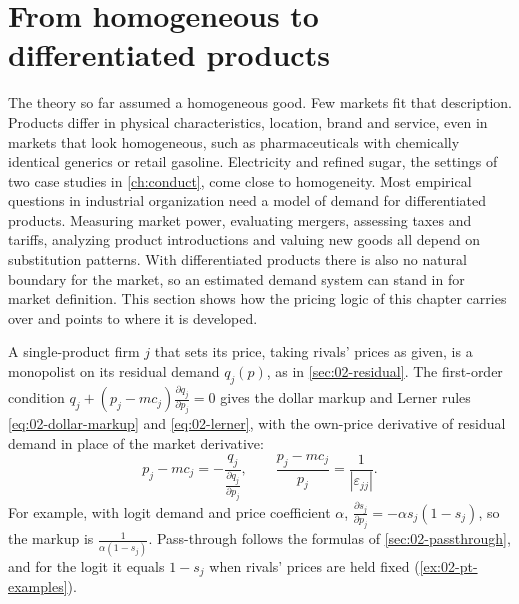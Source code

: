 \section{From homogeneous to differentiated products}\label{sec:02-bridge}

The theory so far assumed a homogeneous good. Few markets fit that description. Products differ in physical
characteristics, location, brand and service, even in markets that look homogeneous, such as pharmaceuticals with
chemically identical generics or retail gasoline. Electricity and refined sugar, the settings of two case studies in
\cref{ch:conduct}, come close to homogeneity. Most empirical questions in industrial organization need a model of
demand for differentiated products. Measuring market power, evaluating mergers, assessing taxes and tariffs,
analyzing product introductions and valuing new goods all depend on substitution patterns. With differentiated
products there is also no natural boundary for the market, so an estimated demand system can stand in for
market definition. This section shows how the pricing logic of this chapter carries over and points to where it is
developed.

A single-product firm $j$ that sets its price, taking rivals' prices as given, is a monopolist on its residual
demand $q_j(p)$, as in \cref{sec:02-residual}. The first-order condition
$q_j + (p_j - mc_j)\frac{\partial q_j}{\partial p_j} = 0$ gives the dollar markup and Lerner rules
\eqref{eq:02-dollar-markup} and \eqref{eq:02-lerner}, with the own-price derivative of residual demand in place
of the market derivative:
\begin{equation}\label{eq:02-single-product-markup}
p_j - mc_j = -\frac{q_j}{\frac{\partial q_j}{\partial p_j}} ,
\qquad
\frac{p_j - mc_j}{p_j} = \frac{1}{|\varepsilon_{jj}|} .
\end{equation}
For example, with logit demand and price coefficient $\alpha$, $\frac{\partial s_j}{\partial p_j} = -\alpha s_j(1 - s_j)$,
so the markup is $\frac{1}{\alpha(1 - s_j)}$. Pass-through follows the formulas of \cref{sec:02-passthrough}, and for
the logit it equals $1 - s_j$ when rivals' prices are held fixed (\cref{ex:02-pt-examples}).

